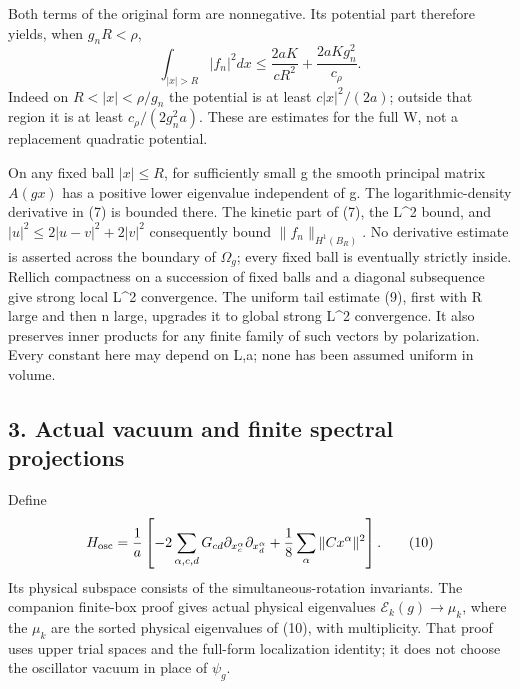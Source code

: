 \documentclass[
  11pt,
]{article}
\begin{document}
Both terms of the original form are nonnegative. Its potential part
therefore yields, when \(g_n R<\rho\), \[
 \int_{|x|>R}|f_n|^2dx
   \le \frac{2aK}{cR^2}+\frac{2aK g_n^2}{c_\rho}.        \tag{9}
\] Indeed on \(R<|x|<\rho/g_n\) the potential is at least
\(c|x|^2/(2a)\); outside that region it is at least
\(c_\rho/(2g_n^2a)\). These are estimates for the full W, not a
replacement quadratic potential.

On any fixed ball \(|x|\le R\), for sufficiently small g the smooth
principal matrix \(A(gx)\) has a positive lower eigenvalue independent
of g. The logarithmic-density derivative in (7) is bounded there. The
kinetic part of (7), the L\^{}2 bound, and \(|u|^2\le2|u-v|^2+2|v|^2\)
consequently bound \(\|f_n\|_{H^1(B_R)}\). No derivative estimate is
asserted across the boundary of \(\Omega_g\); every fixed ball is
eventually strictly inside. Rellich compactness on a succession of fixed
balls and a diagonal subsequence give strong local L\^{}2 convergence.
The uniform tail estimate (9), first with R large and then n large,
upgrades it to global strong L\^{}2 convergence. It also preserves inner
products for any finite family of such vectors by polarization. Every
constant here may depend on L,a; none has been assumed uniform in
volume.

\subsection{3. Actual vacuum and finite spectral
projections}\label{weak-coupling-part-2-actual-vacuum-and-finite-spectral-projections}

Define \[
 H_{\rm osc}=\frac1a\left[-2\sum_{\alpha,c,d}G_{cd}
      \partial_{x_c^\alpha}\partial_{x_d^\alpha}
                +\frac18\sum_\alpha\|Cx^\alpha\|^2\right].
                                                               \tag{10}
\] Its physical subspace consists of the simultaneous-rotation
invariants. The companion finite-box proof gives actual physical
eigenvalues \(\mathcal E_k(g)\to\mu_k\), where the \(\mu_k\) are the
sorted physical eigenvalues of (10), with multiplicity. That proof uses
upper trial spaces and the full-form localization identity; it does not
choose the oscillator vacuum in place of \(\psi_g\).
\end{document}
